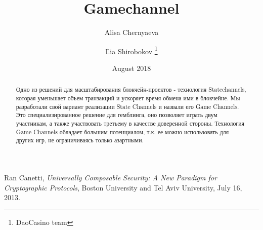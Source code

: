 \documentclass[tikz, 12pt]{article}
\title {Gamechannel}
\author {Alisa Chernyaeva \and Ilia Shirobokov \thanks{DaoCasino team}}
\date {August 2018}
\theoremstyle{definition}
\theoremstyle{remark}
\begin{document}
\maketitle
	\begin{abstract}
Одно из решений для масштабирования блокчейн-проектов - технология Statechannels, которая уменьшает объем транзакций и ускоряет время обмена ими в блокчейне.
Мы разработали свой вариант реализации State Channels и назвали его Game Channels. Это специализированное решение для гемблинга, оно позволяет играть двум участникам, а также участвовать третьему в качестве доверенной стороны. 
Технология Game Channels обладает большим потенциалом, т.к. ее можно использовать для других игр, не ограничиваясь только азартными.
	\end{abstract}
\tableofcontents	
	
	
		


	\begin{thebibliography}{9}
Ran Canetti, \emph{Universally Composable Security: A New Paradigm for Cryptographic Protocols}, Boston University and Tel Aviv University, July 16, 2013.
\end{thebibliography}


		
\end{document}
